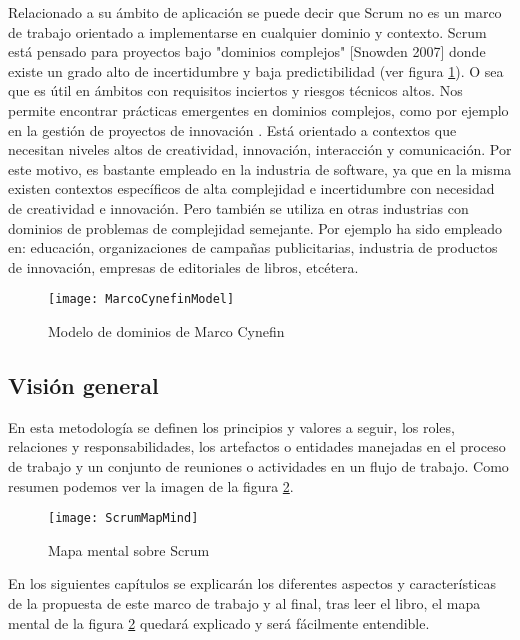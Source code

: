 Relacionado a su ámbito de aplicación se puede decir que Scrum no es un marco de trabajo orientado a implementarse en cualquier dominio y contexto. Scrum está pensado para proyectos bajo "dominios complejos" [Snowden 2007] donde existe un grado alto de incertidumbre y baja predictibilidad (ver figura \ref{fig:MarcoCynefinModel}). O sea que es útil en ámbitos con requisitos inciertos y riesgos técnicos altos. Nos permite encontrar prácticas emergentes en dominios complejos, como por ejemplo en la gestión de proyectos de innovación \cite{Martin-Alaimo-2014}. Está orientado a contextos que necesitan niveles altos de creatividad, innovación, interacción y comunicación. Por este motivo, es bastante empleado en la industria de software, ya que en la misma existen contextos específicos de alta complejidad e incertidumbre con necesidad de creatividad e innovación. Pero también se utiliza en otras industrias con dominios de problemas de complejidad semejante. Por ejemplo ha sido empleado en: educación, organizaciones de campañas publicitarias, industria de productos de innovación, empresas de editoriales de libros, etcétera.

\begin{figure}[h]
  \centering
  \texttt{[image: MarcoCynefinModel]}
  \caption{Modelo de dominios de Marco Cynefin}
  \centering
  \label{fig:MarcoCynefinModel} %
\end{figure}

\subsection{Visión general}

En esta metodología se definen los principios y valores a seguir, los roles, relaciones y responsabilidades, los artefactos o entidades manejadas en el proceso de trabajo y un conjunto de reuniones o actividades en un flujo de trabajo. Como resumen podemos ver la imagen de la figura \ref{fig:ScrumMapMind}.

\begin{figure}[h]
  \centering
  \texttt{[image: ScrumMapMind]}
  \caption{Mapa mental sobre Scrum}
  \centering
  \label{fig:ScrumMapMind} %
\end{figure}

En los siguientes capítulos se explicarán los diferentes aspectos y características de la propuesta de este marco de trabajo y al final, tras leer el libro, el mapa mental de la figura \ref{fig:ScrumMapMind} quedará explicado y será fácilmente entendible. 
